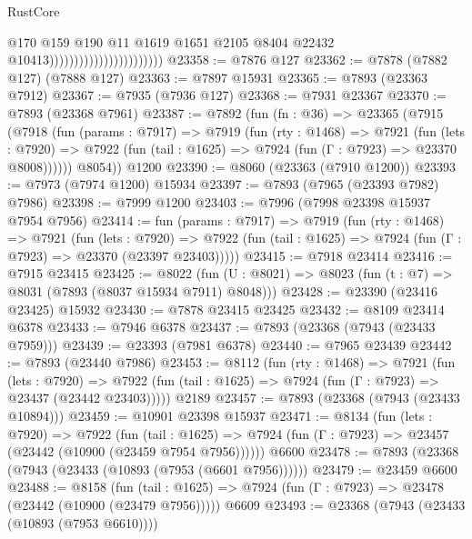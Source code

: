 \begin{lexlean}{RustCore}
\begin{coremodule}
                                                  @170
                                                  @159
                                                  @190
                                                  @11
                                                  @1619
                                                  @1651
                                                  @2105
                                                  @8404
                                                  @22432
                                                  @10413)))))))))))))))))))))))
@23358 := @7876 @127
@23362 := @7878 (@7882 @127) (@7888 @127)
@23363 := @7897 @15931
@23365 := @7893 (@23363 @7912)
@23367 := @7935 (@7936 @127)
@23368 := @7931 @23367
@23370 := @7893 (@23368 @7961)
@23387 := @7892
    (fun (fn : @36) =>
    @23365
      (@7915
        (@7918
          (fun (params : @7917) =>
          @7919
            (fun (rty : @1468) =>
            @7921
              (fun (lets : @7920) =>
              @7922 (fun (tail : @1625) => @7924 (fun (Γ : @7923) => @23370 @8008))))))
        @8054))
    @1200
@23390 := @8060 (@23363 (@7910 @1200))
@23393 := @7973 (@7974 @1200) @15934
@23397 := @7893 (@7965 (@23393 @7982) @7986)
@23398 := @7999 @1200
@23403 := @7996 (@7998 @23398 @15937 @7954 @7956)
@23414 := fun (params : @7917) =>
  @7919
    (fun (rty : @1468) =>
    @7921
      (fun (lets : @7920) =>
      @7922 (fun (tail : @1625) => @7924 (fun (Γ : @7923) => @23370 (@23397 @23403)))))
@23415 := @7918 @23414
@23416 := @7915 @23415
@23425 := @8022
    (fun (U : @8021) => @8023 (fun (t : @7) => @8031 (@7893 (@8037 @15934 @7911) @8048)))
@23428 := @23390 (@23416 @23425) @15932
@23430 := @7878 @23415 @23425
@23432 := @8109 @23414 @6378
@23433 := @7946 @6378
@23437 := @7893 (@23368 (@7943 (@23433 @7959)))
@23439 := @23393 (@7981 @6378)
@23440 := @7965 @23439
@23442 := @7893 (@23440 @7986)
@23453 := @8112
    (fun (rty : @1468) =>
    @7921
      (fun (lets : @7920) =>
      @7922 (fun (tail : @1625) => @7924 (fun (Γ : @7923) => @23437 (@23442 @23403)))))
    @2189
@23457 := @7893 (@23368 (@7943 (@23433 @10894)))
@23459 := @10901 @23398 @15937
@23471 := @8134
    (fun (lets : @7920) =>
    @7922
      (fun (tail : @1625) =>
      @7924 (fun (Γ : @7923) => @23457 (@23442 (@10900 (@23459 @7954 @7956))))))
    @6600
@23478 := @7893 (@23368 (@7943 (@23433 (@10893 (@7953 (@6601 @7956))))))
@23479 := @23459 @6600
@23488 := @8158
    (fun (tail : @1625) => @7924 (fun (Γ : @7923) => @23478 (@23442 (@10900 (@23479 @7956)))))
    @6609
@23493 := @23368 (@7943 (@23433 (@10893 (@7953 @6610))))

\end{coremodule}
\end{lexlean}
